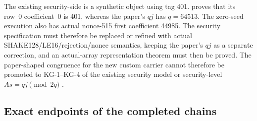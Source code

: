 \begin{openobligation}
The existing security-side  is a
synthetic object using  tag 401.
 proves that its row~0
coefficient~0 is 401, whereas the paper's \(qj\) has \(q=64513\).
The zero-seed execution also has actual nonce-515 first coefficient 44985.
The security specification must therefore be replaced or refined with actual
SHAKE128/LE16/rejection/nonce semantics, keeping the paper's \(qj\) as a
separate correction, and an actual-array representation theorem must then
be proved. The paper-shaped congruence for the new custom carrier cannot
therefore be promoted to KG-1--KG-4 of the existing security model or
security-level \(A s=qj\pmod{2q}\)
\cite{post-freeze-kg-actual-avec-qj-report}.
\end{openobligation}

\subsection{Exact endpoints of the completed chains}

